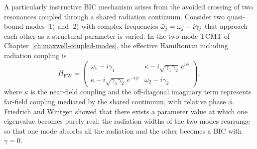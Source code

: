 A particularly instructive BIC mechanism arises from the avoided crossing
of two resonances coupled through a shared radiation continuum. Consider
two quasi-bound modes $|1\rangle$ and $|2\rangle$ with complex frequencies
$\tilde{\omega}_j = \omega_j - i\gamma_j$ that approach each other as a structural
parameter is varied. In the two-mode TCMT of
Chapter~\ref{ch:maxwell-coupled-modes}, the effective Hamiltonian including
radiation coupling is
\begin{equation}
 H_{\mathrm{FW}} =
 \begin{pmatrix}
 \omega_1 - i\gamma_1 & \kappa - i\sqrt{\gamma_1\gamma_2}\,e^{i\phi} \\
 \kappa - i\sqrt{\gamma_1\gamma_2}\,e^{-i\phi} & \omega_2 - i\gamma_2
 \end{pmatrix},
 \label{eq:fw-hamiltonian}
\end{equation}
where $\kappa$ is the near-field coupling and the off-diagonal imaginary
term represents far-field coupling mediated by the shared continuum, with
relative phase $\phi$. Friedrich and Wintgen showed that there exists a
parameter value at which one eigenvalue becomes purely real: the radiation
widths of the two modes rearrange so that one mode absorbs all the
radiation and the other becomes a BIC with $\gamma = 0$.

